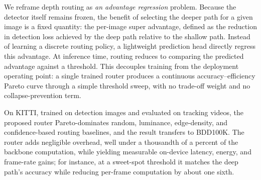 We reframe depth routing as \emph{an advantage regression} problem. 
Because the detector itself remains frozen, the benefit of selecting the deeper path for a given image is a fixed quantity: the per-image super advantage, defined as the reduction in detection loss achieved by the deep path relative to the shallow path.
Instead of learning a discrete routing policy, a lightweight prediction head directly regress this advantage.
At inference time, routing reduces to comparing the predicted advantage against a threshold. 
This decouples training from the deployment operating point: a single trained router produces a continuous accuracy--efficiency Pareto curve through a simple threshold sweep,
with no trade-off weight and no collapse-prevention term. 


On KITTI, trained on
detection images and evaluated on tracking videos, the proposed router
Pareto-dominates random, luminance, edge-density, and confidence-based routing
baselines, and the result transfers to BDD100K. The router adds negligible
overhead, well under a thousandth of a percent of the backbone computation,
while yielding measurable on-device latency, energy, and frame-rate gains; for
instance, at a sweet-spot threshold it matches the deep path's accuracy while
reducing per-frame computation by about one sixth.

    
    

